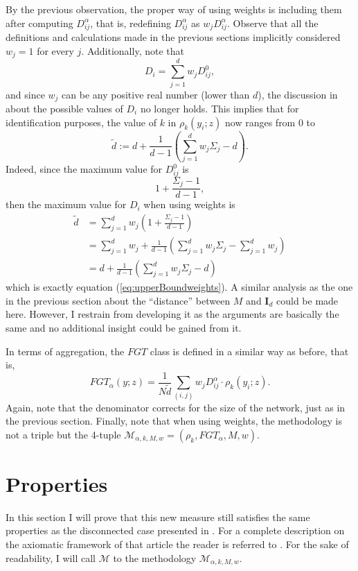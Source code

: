 \documentclass[english, a4paper,12pt]{article}
\begin{document}
By the previous observation, the proper way of using weights is including them after computing $D_{ij}^{\alpha}$, that is, redefining $D_{ij}^{\alpha}$ as $w_{j}D_{ij}^{\alpha}$. Observe that all the definitions and calculations made in the previous sections implicitly considered $w_{j} = 1$ for every $j$. Additionally, note that
	$$D_{i} = \sum_{j=1}^{d} w_{j}D_{ij}^{0},$$
and since $w_{j}$ can be any positive real number (lower than $d$), the discussion in  about the possible values of $D_{i}$ no longer holds. This implies that for identification purposes, the value of $k$ in $\rho_{k}(y_{i}; z)$ now ranges from 0 to 
	\begin{equation} \label{eq:upperBoundweights}
		\tilde{d} := d + \frac{1}{d-1}\left(\sum_{j=1}^{d} w_{j}\Sigma_{j} - d \right).
	\end{equation}
Indeed, since the maximum value for $D_{ij}^{0}$ is 
	$$1 + \frac{\Sigma_{j} - 1}{d-1},$$
then the maximum value for $D_{i}$ when using weights is
	\begin{align*}
		\tilde{d}
			&=	\sum_{j=1}^{d} w_{j} \left(1 + \frac{\Sigma_{j} - 1}{d-1} \right)	\\
			&=	\sum_{j=1}^{d} w_{j} + \frac{1}{d-1} \left( \sum_{j=1}^{d} w_{j}\Sigma_{j} - \sum_{j=1}^{d} w_{j} \right)	\\
			&=	d + \frac{1}{d-1}\left(\sum_{j=1}^{d} w_{j}\Sigma_{j} - d \right)
	\end{align*}
which is exactly equation (\ref{eq:upperBoundweights}). A similar analysis as the one in the previous section about the ``distance'' between $M$ and $\mathbf{I}_{d}$ could be made here. However, I restrain from developing it as the arguments are basically the same and no additional insight could be gained from it.

In terms of aggregation, the $FGT$ class is defined in a similar way as before, that is,
	\begin{equation} \label{eq:rightFGTweights}
		FGT_{\alpha}(y; z) = \frac{1}{N\tilde{d}} \sum_{(i,j)} w_{j}D_{ij}^{\alpha} \cdot \rho_{k}(y_{i}; z).
	\end{equation}
Again, note that the denominator corrects for the size of the network, just as in the previous section. Finally, note that when using weights, the methodology is not a triple but the 4-tuple $\mathcal{M}_{\alpha, k, M, w} = (\rho_{k}, FGT_{\alpha}, M, w)$.
	
\section{Properties} \label{sec:properties}
In this section I will prove that this new measure still satisfies the same properties as the disconnected case presented in \cite{AlkireFoster11}. For a complete description on the axiomatic framework of that article the reader is referred to . For the sake of readability, I will call $\mathcal{M}$ to the methodology $\mathcal{M}_{\alpha, k, M, w}$.
\end{document}
